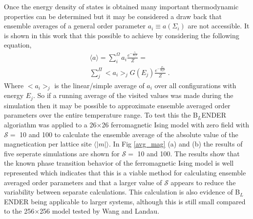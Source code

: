 \documentclass[aps,prl,reprint,superscriptaddress,showkeys]{revtex4-1}
\begin{document}
 Once the energy density of states is obtained many important thermodynamic properties can be determined but it may be considered a draw back that ensemble averages of a general order parameter $a_i \equiv a(\Sigma_i)$ are not accessible.  It is shown in this work that this possible to achieve by considering the following equation, 
\begin{equation}
\begin{split}
&\langle a \rangle = \sum_i^{\Omega}a_i \frac{ e^{- \frac{e_i}{K_bT}  }}{Z} = \\
&\sum_j^{\Pi}<a_i>_{j}G(E_j)\frac{e^{-\frac{E_J}{K_bT} }}{Z} \; . 
\end{split} 
\end{equation}
Where $<a_i>_{j}$ is the linear/simple average of $a_i$ over all configurations with energy $E_j$. So if a running average of the visited values was made during the simulation then it may be possible to approximate ensemble averaged order parameters over the entire temperature range.  To test this the B$_L$ENDER algoriathm was applied to a 26$\times$26 ferromagnetic Ising model with zero field with $\mathcal{S}=$ 10 and 100 to calculate the ensemble average of the absolute value of the magnetication per lattice site $\langle |m| \rangle$. In Fig \ref{avg_mag} (a) and (b) the results of five seperate simulations are shown for $\mathcal{S}=$ 10 and 100.  The results show that the known phase transition behavior of the ferromagnetic Ising model is well represented which indicates that this is a viable method for calculating ensemble averaged order parameters and that a larger value of $\mathcal{S}$ appears to reduce the variability between separate calculations.  This calculation is also evidence of B$_L$ENDER being applicable to larger systems, although this is still small compared to the 256$\times$256 model tested by Wang and Landau. 


\end{document}
